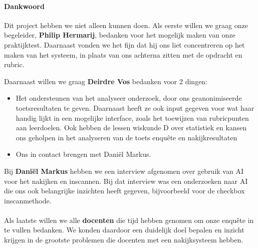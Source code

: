 \documentclass[12pt]{article}
\begin{document}
\begin{multicols}{2}
\paragraph*{Dankwoord} 
Dit project hebben we niet alleen kunnen doen. Als eerste willen we graag onze begeleider, \textbf{Philip Hermarij}, bedanken voor het mogelijk maken van onze praktijktest. Daarnaast vonden we het fijn dat hij ons liet concentreren op het maken van het systeem, in plaats van ons achterna zitten met de opdracht en rubric.\\
\noindent\begin{minipage}{ \linewidth}
Daarnaast willen we graag \textbf{Deirdre Vos} bedanken voor 2 dingen:
\noindent\begin{itemize}
    \item  Het ondersteunen van het analyseer onderzoek, door ons geanonimiseerde toetsresultaten te geven. Daarnaast heeft ze ook input gegeven voor wat haar handig lijkt in een mogelijke interface, zoals het toewijzen van rubricpunten aan leerdoelen. Ook hebben de lessen wiskunde D over statistiek en kansen ons geholpen in het analyseren van de toets enquête en nakijkresultaten\\
    \item Ons in contact brengen met Daniël Markus. 
\end{itemize}
\end{minipage}
Bij \textbf{Daniël Markus} hebben we een interview afgenomen over gebruik van AI voor het nakijken en inscannen. Bij dat interview was een onderzoeken naar AI die ons ook belangrijke inzichten heeft gegeven, bijvoorbeeld voor de checkbox inscanmethode.\\
\\
Als laatste willen we alle \textbf{docenten} die tijd hebben genomen om onze enquête in te vullen  bedanken. We konden daardoor een duidelijk doel bepalen en inzicht krijgen in de grootste problemen die docenten met een nakijksysteem hebben.


\end{multicols}

\pagebreak
\end{document}
